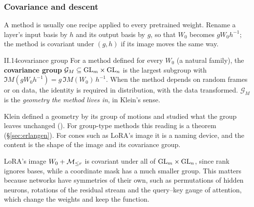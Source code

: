 \subsubsection{Covariance and descent}\label{sec:cut-covariance}

A method is usually one recipe applied to every pretrained weight. Rename a layer's input basis by $h$ and its output
basis by $g$, so that $W_0$ becomes $gW_0h^{-1}$; the method is covariant under $(g,h)$ if its image moves the same way.

\begin{definition}{II.14}{covariance group}
For a method defined for every $W_0$ (a natural family), the \textbf{covariance group}
$\mathcal G_M\subseteq\mathrm{GL}_m\times\mathrm{GL}_n$ is the largest subgroup with $\Im M(gW_0h^{-1})=g\,\Im M(W_0)\,h^{-1}$. When
the method depends on random frames or on data, the identity is required in distribution, with the data transformed.
$\mathcal G_M$ is the \emph{geometry the method lives in}, in Klein's sense.
\end{definition}

Klein defined a geometry by its group of motions and studied what the group leaves unchanged
\citep{xklein1872vergleichende} (). For group-type methods this reading is a theorem (\S\ref{sec:erlangen}).
For cones such as LoRA's image it is a naming device, and the content is the shape of the image and its covariance group.

LoRA's image $W_0+\mathcal{M}_{\le r}$ is covariant under all of $\mathrm{GL}_m\times\mathrm{GL}_n$, since rank ignores bases, while a coordinate mask
has a much smaller group. This matters because networks have symmetries of their own, such as permutations of hidden
neurons, rotations of the residual stream and the query--key gauge of attention, which change the weights and keep the
function.


